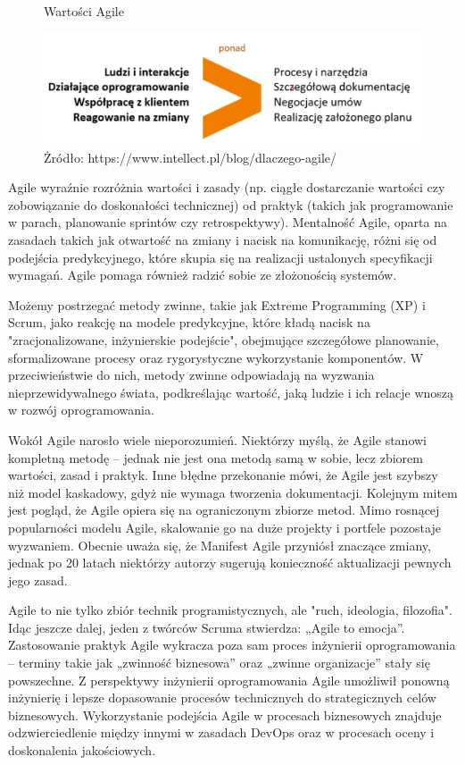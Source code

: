 \begin{figure}
    \centering
    \caption{Wartości Agile}
    \includegraphics[width=1\linewidth]{img/agile2.png}
    \caption*{Żródło: https://www.intellect.pl/blog/dlaczego-agile/}
\end{figure}

Agile wyraźnie rozróżnia wartości i zasady (np. ciągłe dostarczanie wartości czy zobowiązanie do doskonałości technicznej) od praktyk (takich jak programowanie w parach, planowanie sprintów czy retrospektywy). 
Mentalność Agile, oparta na zasadach takich jak otwartość na zmiany i nacisk na komunikację, różni się od podejścia predykcyjnego, które skupia się na realizacji ustalonych specyfikacji wymagań. Agile pomaga również radzić sobie ze złożonością systemów. \autocite{swebok}

Możemy postrzegać metody zwinne, takie jak Extreme Programming (XP) i Scrum, jako reakcję na modele predykcyjne, które kładą nacisk na "zracjonalizowane, inżynierskie podejście", \autocite{dyba2000} obejmujące szczegółowe planowanie, sformalizowane procesy oraz rygorystyczne wykorzystanie komponentów. \autocite{boehm2002} W przeciwieństwie do nich, metody zwinne odpowiadają na wyzwania nieprzewidywalnego świata, podkreślając wartość, jaką ludzie i ich relacje wnoszą w rozwój oprogramowania. \autocite{dyba2009we}\autocite{nerur2007}

Wokół Agile narosło wiele nieporozumień. Niektórzy myślą, że Agile stanowi kompletną metodę – jednak nie jest ona metodą samą w sobie, lecz zbiorem wartości, zasad i praktyk. Inne błędne przekonanie mówi, że Agile jest szybszy niż model kaskadowy, gdyż nie wymaga tworzenia dokumentacji. Kolejnym mitem jest pogląd, że Agile opiera się na ograniczonym zbiorze metod. 
Mimo rosnącej popularności modelu Agile, skalowanie go na duże projekty i portfele pozostaje wyzwaniem. Obecnie uważa się, że Manifest Agile przyniósł znaczące zmiany, jednak po 20 latach niektórzy autorzy sugerują konieczność aktualizacji pewnych jego zasad. \autocite{swebok}

Agile to nie tylko zbiór technik programistycznych, ale "ruch, ideologia, filozofia". Idąc jeszcze dalej, jeden z twórców Scruma stwierdza: „Agile to emocja”. \autocite{meyer2014agile} Zastosowanie praktyk Agile wykracza poza sam proces inżynierii oprogramowania – terminy takie jak „zwinność biznesowa” oraz „zwinne organizacje” stały się powszechne. Z perspektywy inżynierii oprogramowania Agile umożliwił ponowną inżynierię i lepsze dopasowanie procesów technicznych do strategicznych celów biznesowych. Wykorzystanie podejścia Agile w procesach biznesowych znajduje odzwierciedlenie między innymi w zasadach DevOps oraz w procesach oceny i doskonalenia jakościowych. \autocite{swebok}


